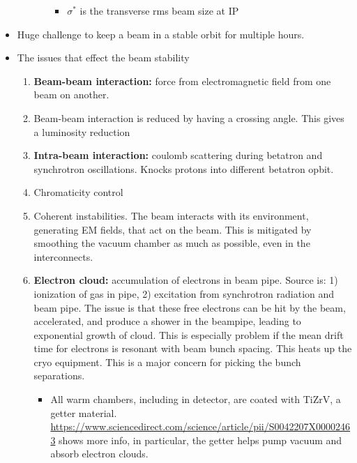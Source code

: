 \begin{itemize}
\begin{enumerate}
\begin{itemize}
\begin{itemize}
                \item $\sigma^*$ is the transverse rms beam size at IP \cite{lyndon}
            \end{itemize}
        \end{itemize}
    \end{enumerate}
    \item Huge challenge to keep a beam in a stable orbit for multiple hours.
    \item The issues that effect the beam stability
    \begin{enumerate}\scriptsize
        \item \textbf{Beam-beam interaction:} force from electromagnetic field from one beam on another.  \cite{lyndon}
        \item Beam-beam interaction is reduced by having a crossing angle. This gives a luminosity reduction \cite{lyndon}
        \item \textbf{Intra-beam interaction:} coulomb scattering during betatron and synchrotron oscillations. Knocks protons into different betatron opbit. \cite{lyndon}
        \item Chromaticity control
        \item Coherent instabilities. The beam interacts with its environment, generating EM fields, that act on the beam. This is mitigated by smoothing the vacuum chamber as much as possible, even in the interconnects. \cite{lyndon}
        \item \textbf{Electron cloud:} accumulation of electrons in beam pipe. Source is: 1) ionization of gas in pipe, 2) excitation from synchrotron radiation and beam pipe. The issue is that these free electrons can be hit by the beam, accelerated, and produce a shower in the beampipe, leading to exponential growth of cloud. This is especially problem if the mean drift time for electrons is resonant with beam bunch spacing. This heats up the cryo equipment. This is a major concern for picking the bunch separations. \cite{lyndon}
        \begin{itemize}\scriptsize
            \item All warm chambers, including in detector, are coated with TiZrV, a getter material. {\color{blue} \url{https://www.sciencedirect.com/science/article/pii/S0042207X00002463} shows more info, in particular, the getter helps pump vacuum and absorb electron clouds.} \cite{lyndon}
        \end{itemize}
    \end{enumerate}
\end{itemize}


